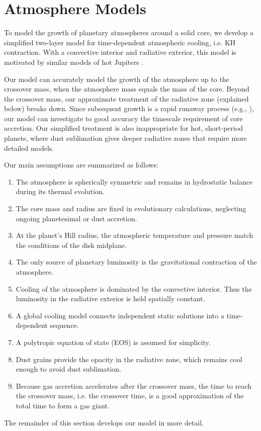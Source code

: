 \documentclass[apj, numberedappendix]{emulateapj}
\begin{document}


\section{Atmosphere Models} \label{sec:model}

To model the growth of planetary atmospheres around a solid core, we develop a simplified two-layer model for time-dependent atmospheric cooling, i.e. KH contraction.  With a convective interior and radiative exterior, this model is motivated by similar models of hot Jupiters \citep{ab06, ym10}. 

Our model can accurately model the growth of the atmosphere up to the crossover mass, when the atmosphere mass equals the mass of the core.   Beyond the crossover mass,  our approximate treatment of the radiative zone (explained below) breaks down.  
Since subsequent growth is a rapid runaway process (e.g., \citealt{pollack96}), our model can investigate to good accuracy the timescale requirement of core accretion.  Our simplified treatment is also inappropriate for hot, short-period planets, where dust sublimation gives deeper radiative zones that require more detailed models.

Our main assumptions are summarized as follows:
\begin{enumerate}
\item The atmosphere is spherically symmetric and remains in hydrostatic balance during its thermal evolution.
\item The core mass and radius are fixed in evolutionary calculations, neglecting ongoing planetesimal or dust accretion.
\item At the planet's Hill radius, the atmospheric temperature and pressure match the conditions of the disk midplane.
\item The only source of planetary luminosity is the gravitational contraction of the atmosphere.  
\item Cooling of the atmosphere is dominated by the convective interior.  Thus the luminosity in the radiative exterior is held spatially constant. %
\item A global cooling model connects independent static solutions into a time-dependent sequence.
\item A polytropic equation of state (EOS) is assumed for simplicity. %
\item Dust grains provide the opacity in the radiative zone, which remains cool enough to avoid dust sublimation.
\item Because gas accretion accelerates after the crossover mass, the time to reach the crossover mass, i.e. the crossover time, is a good approximation of the total time to form a gas giant.
\end{enumerate}
The remainder of this section develops our model in more detail.
\end{document}
